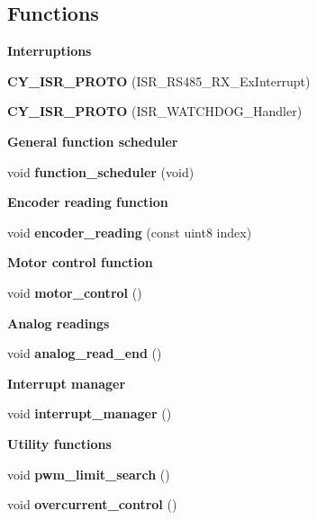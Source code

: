 \subsection*{Functions}
\begin{Indent}\textbf{ Interruptions}\par
\begin{DoxyCompactItemize}
\item 
\textbf{ C\+Y\+\_\+\+I\+S\+R\+\_\+\+P\+R\+O\+TO} (I\+S\+R\+\_\+\+R\+S485\+\_\+\+R\+X\+\_\+\+Ex\+Interrupt)
\item 
\textbf{ C\+Y\+\_\+\+I\+S\+R\+\_\+\+P\+R\+O\+TO} (I\+S\+R\+\_\+\+W\+A\+T\+C\+H\+D\+O\+G\+\_\+\+Handler)
\end{DoxyCompactItemize}
\end{Indent}
\begin{Indent}\textbf{ General function scheduler}\par
\begin{DoxyCompactItemize}
\item 
void \textbf{ function\+\_\+scheduler} (void)
\end{DoxyCompactItemize}
\end{Indent}
\begin{Indent}\textbf{ Encoder reading function}\par
\begin{DoxyCompactItemize}
\item 
void \textbf{ encoder\+\_\+reading} (const uint8 index)
\end{DoxyCompactItemize}
\end{Indent}
\begin{Indent}\textbf{ Motor control function}\par
\begin{DoxyCompactItemize}
\item 
void \textbf{ motor\+\_\+control} ()
\end{DoxyCompactItemize}
\end{Indent}
\begin{Indent}\textbf{ Analog readings}\par
\begin{DoxyCompactItemize}
\item 
void \textbf{ analog\+\_\+read\+\_\+end} ()
\end{DoxyCompactItemize}
\end{Indent}
\begin{Indent}\textbf{ Interrupt manager}\par
\begin{DoxyCompactItemize}
\item 
void \textbf{ interrupt\+\_\+manager} ()
\end{DoxyCompactItemize}
\end{Indent}
\begin{Indent}\textbf{ Utility functions}\par
\begin{DoxyCompactItemize}
\item 
void \textbf{ pwm\+\_\+limit\+\_\+search} ()
\item 
void \textbf{ overcurrent\+\_\+control} ()
\end{DoxyCompactItemize}
\end{Indent}


